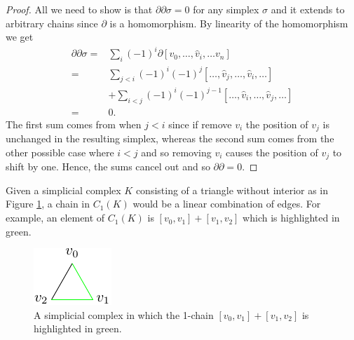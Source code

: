 \begin{proof}
  All we need to show is that $\partial \partial \sigma = 0 $ for any simplex $\sigma$ and it extends to arbitrary chains since $\partial$ is a homomorphism. By linearity of the homomorphism we get
  \begin{align*}
    \partial \partial \sigma =& \sum_{i} (-1)^{i} \partial [v_{0}, \dots, \hat v_{i}, \dots v_{n}] \\
    =& \sum_{j < i} (-1)^{i} (-1)^{j} [ \dots,  \hat v_{j}, \dots , \hat v_{i}, \dots ] \\ &+ \sum_{i < j} (-1)^{i} (-1)^{j-1}  [ \dots,  \hat v_{i}, \dots , \hat v_{j}, \dots ] \\
    =& 0.
  \end{align*}
  The first sum comes from when $j<i$ since if remove $v_{i}$ the position of $v_{j}$ is unchanged in the resulting simplex, whereas the second sum comes from the other possible case where $i<j$ and so removing $v_{i}$ causes the position of $v_{j}$ to shift by one. Hence, the sums cancel out and so $\partial \partial = 0$. \end{proof}

\begin{example}
Given a simplicial complex $K$ consisting of a triangle without interior as in Figure \ref{trichain}, a chain in $C_{1}(K)$ would be a linear combination of edges. For example, an element of $C_{1}(K)$ is $[v_{0},v_{1}]+[v_{1},v_{2}]$ which is highlighted in green.
\begin{figure}[ht]
  \centering
  \includegraphics[scale=2]{trichain.pdf}
  \caption{\label{trichain} A simplicial complex in which the 1-chain $[v_{0},v_{1}]+[v_{1},v_{2}]$ is highlighted in green.}
\end{figure}
\end{example}

